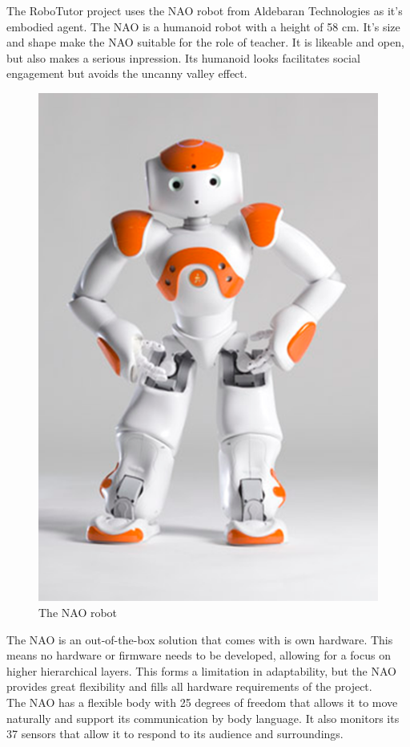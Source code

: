The RoboTutor project uses the NAO robot from Aldebaran Technologies as it's embodied agent. The NAO is a humanoid robot with a height of 58 cm. It's size and shape make the NAO suitable for the role of teacher. It is likeable and open, but also makes a serious inpression. Its humanoid looks facilitates social engagement but avoids the uncanny valley effect.\cite{mori1970uncanny}\\

\begin{figure}
\centering
	\includegraphics[scale=0.3]{images/NAO.png}
	\caption{The NAO robot}\label{fig:nao}
\end{figure}


The NAO is an out-of-the-box solution that comes with is own hardware. This means no hardware or firmware needs to be developed, allowing for a focus on higher hierarchical layers. This forms a limitation in adaptability, but the NAO provides great flexibility and fills all hardware requirements of the project. \\

The NAO has a flexible body with 25 degrees of freedom that allows it to move naturally and support its communication by body language. It also monitors its 37 sensors that allow it to respond to its audience and surroundings.\\

